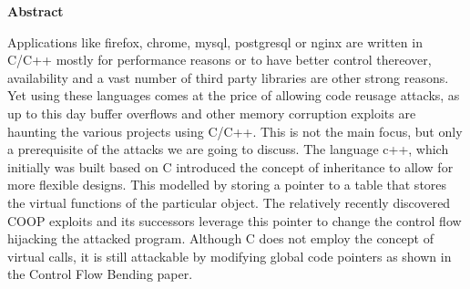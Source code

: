 

\clearemptydoublepage
{}
{}	

\vspace*{2cm}
\begin{center}
{\Large \bf Abstract}
\end{center}
\vspace{1cm}
Applications like firefox, chrome, mysql, postgresql or nginx are written in C/C++ mostly for 
performance reasons or to have better control thereover, availability and a vast number 
of third party libraries are other strong reasons. Yet using these languages comes at 
the price of allowing code reusage attacks, as up to this day buffer overflows and other
memory corruption exploits are haunting the various projects using C/C++. This is not 
the main focus, but only a prerequisite of the attacks we are going to discuss. 
The language c++, which initially was built based on C introduced the concept of inheritance
to allow for more flexible designs. This modelled by storing a pointer to a table that stores
the virtual functions of the particular object. The relatively recently discovered COOP
exploits and its successors leverage this pointer to change the control flow hijacking 
the attacked program. Although C does not employ the concept of virtual calls, it is still
attackable by modifying global code pointers as shown in the Control Flow Bending paper.


